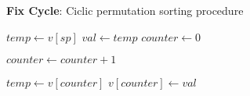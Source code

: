 \begin{algorithm}
\caption*{\textbf{Fix Cycle}: Ciclic permutation sorting procedure}
\begin{algorithmic}[1]
    \State $temp \leftarrow v[sp]$
	\Do
		\State $val \leftarrow temp$
		\State $counter \leftarrow 0$
		
				\State $counter \leftarrow counter + 1$
			\EndIf
		\EndFor
		
		\State $temp \leftarrow v[counter]$
		\State $v[counter] \leftarrow val$
		
\EndProcedure
\end{algorithmic}
\end{algorithm}